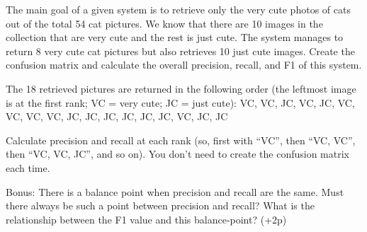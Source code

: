 \documentclass[fontsize=12pt, usenames, dvipsnames, headinclude, headsepline, footinclude, footsepline]{scrartcl}
\begin{document}
\begin{exo}
  The main goal of a given system is to retrieve only the very cute photos of cats out of the total 54 cat
  pictures. We know that there are 10 images in the collection that are very cute and the rest is just
  cute. The system manages to return 8 very cute cat pictures but also retrieves 10 just cute images. Create
  the confusion matrix and calculate the overall precision, recall, and F1 of this system.  

  The 18 retrieved pictures are returned in the following order (the leftmost image is at the first rank; VC =
  very cute; JC = just cute): VC, VC, JC, VC, JC, VC, VC, VC, VC, JC, JC, JC, JC, JC, JC, VC, JC, JC 

  Calculate precision and recall at each rank (so, first with “VC”, then “VC, VC”, then “VC, VC, JC”, and so
  on). You don’t need to create the confusion matrix each time.  

  Bonus: There is a balance point when precision and recall are the same. Must there always be such a point
  between precision and recall? What is the relationship between the F1 value and this balance-point? (+2p)

\end{exo}
\end{document}
